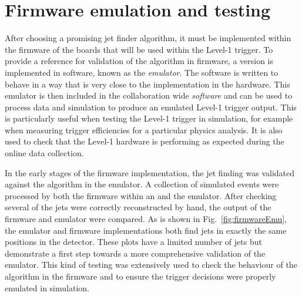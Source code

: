 \section{Firmware emulation and testing}
\label{sec:emu}

After choosing a promising jet finder algorithm, it must be implemented
within the firmware of the \FPGA boards that will be used within the
Level-1 trigger. To provide a reference for validation of the
algorithm in firmware, a version is implemented in software, known as
the \emph{emulator}. The software is written to behave in a way that
is very close to the implementation in the \FPGA hardware. This
emulator is then included in the collaboration wide \emph{\CMS
software} and can be used to process data and simulation to produce an
emulated Level-1 trigger output. This is particularly useful when
testing the Level-1 trigger in simulation, for example when measuring
trigger efficiencies for a particular physics analysis. It is also
used to check that the Level-1 hardware is performing as expected
during the online data collection.

In the early stages of the firmware implementation, the jet finding
was validated against the algorithm in the emulator. A collection of
simulated events were processed by both the firmware within an \FPGA
and the emulator. After checking several of the jets were correctly
reconstructed by hand, the output of the firmware and emulator were
compared. As is shown in Fig.~\ref{fig:firmwareEmu}, the emulator and
firmware implementations both find jets in exactly the same positions
in the detector. These plots have a limited number of jets but demonstrate a first step towards a more
comprehensive validation of the emulator. This kind of testing was
extensively used to check the behaviour of the algorithm in the
firmware and to ensure the trigger decisions were properly emulated
in simulation.

